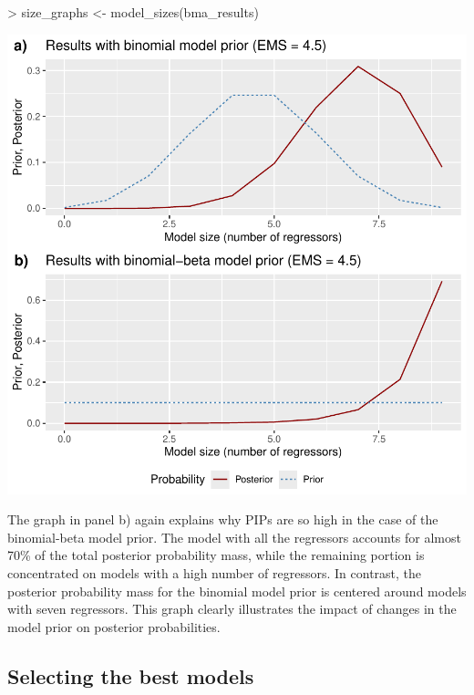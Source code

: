 \documentclass[a4paper]{article}
\begin{document}
\begin{Schunk}
\begin{Sinput}
> size_graphs <- model_sizes(bma_results)
\end{Sinput}
\end{Schunk}
\includegraphics{bdsm_vignette-016}

The graph in panel b) again explains why PIPs are so high in the case of the binomial-beta model prior.
The model with all the regressors accounts for almost 70\% of the total posterior probability mass,
while the remaining portion is concentrated on models with a high number of regressors.
In contrast, the posterior probability mass for the binomial model prior is centered around models with seven regressors.
This graph clearly illustrates the impact of changes in the model prior on posterior probabilities.

\subsection{Selecting the best models}\label{best-models}
\end{document}

